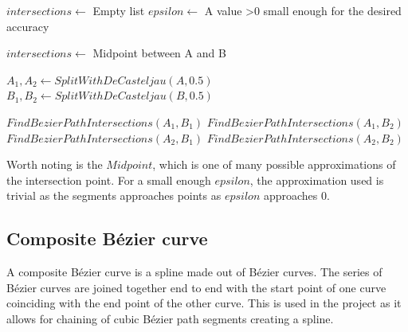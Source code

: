         \vspace{1cm}
        \begin{algorithmic}
            \State $intersections \gets$ Empty list
            \State $epsilon \gets$ A value >0 small enough for the desired accuracy
                    \State \Return
                \EndIf

                    \State $intersections \gets$ Midpoint between A and B
                    \State \Return
                \EndIf

                \State $A_1, A_2 \gets SplitWithDeCasteljau(A, 0.5)$
                \State $B_1, B_2 \gets SplitWithDeCasteljau(B, 0.5)$

                \State $FindBezierPathIntersections(A_1, B_1)$
                \State $FindBezierPathIntersections(A_1, B_2)$
                \State $FindBezierPathIntersections(A_2, B_1)$
                \State $FindBezierPathIntersections(A_2, B_2)$
            \EndProcedure
        \end{algorithmic}
        \vspace{1cm}

        Worth noting is the $Midpoint$, which is one of many possible approximations of the intersection point. For a small enough $epsilon$, the approximation used is trivial as the segments approaches points as $epsilon$ approaches 0.

    \subsection{Composite Bézier curve}
        A composite Bézier curve is a spline made out of Bézier curves. The series of Bézier curves are joined together end to end with the start point of one curve coinciding with the end point of the other curve. This is used in the project as it allows for chaining of cubic Bézier path segments creating a spline.